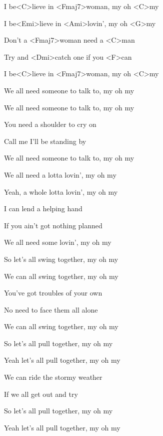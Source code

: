 

\zs
I be<C>lieve in <Fmaj7>woman, my oh <C>my

I be<Emi>lieve in <Ami>lovin', my oh <G>my

Don't a <Fmaj7>woman need a <C>man

Try and <Dmi>catch one if you <F>can

I be<C>lieve in <Fmaj7>woman, my oh <C>my
\ks

\zs
We all need someone to talk to, my oh my

We all need someone to talk to, my oh my

You need a shoulder to cry on

Call me I'll be standing by

We all need someone to talk to, my oh my
\ks

\zs
We all need a lotta lovin', my oh my

Yeah, a whole lotta lovin', my oh my

I can lend a helping hand

If you ain't got nothing planned

We all need some lovin', my oh my
\ks

\zs
So let's all swing together, my oh my

We can all swing together, my oh my

You've got troubles of your own

No need to face them all alone

We can all swing together, my oh my
\ks

\zs
So let's all pull together, my oh my

Yeah let's all pull together, my oh my

We can ride the stormy weather

If we all get out and try

So let's all pull together, my oh my

Yeah let's all pull together, my oh my
\ks

\kp
